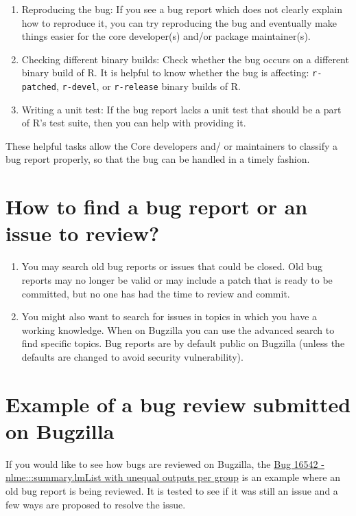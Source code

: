 \documentclass[
]{book}
\begin{document}
\begin{enumerate}
\def\labelenumi{\arabic{enumi}.}
\item
  Reproducing the bug: If you see a bug report which does not clearly explain how to reproduce it, you can try reproducing the bug and eventually make things easier for the core developer(s) and/or package maintainer(s).
\item
  Checking different binary builds: Check whether the bug occurs on a different binary build of R. It is helpful to know whether the bug is affecting: \texttt{r-patched}, \texttt{r-devel}, or \texttt{r-release} binary builds of R.
\item
  Writing a unit test: If the bug report lacks a unit test that should be a part of R's test suite, then you can help with providing it.
\end{enumerate}

These helpful tasks allow the Core developers and/ or maintainers to classify a bug report properly, so that the bug can be handled in a timely fashion.

\section{How to find a bug report or an issue to review?}\label{how-to-find-a-bug-report-or-an-issue-to-review}

\begin{enumerate}
\def\labelenumi{\arabic{enumi}.}
\item
  You may search old bug reports or issues that could be closed. Old bug reports may no longer be valid or may include a patch that is ready to be committed, but no one has had the time to review and commit.
\item
  You might also want to search for issues in topics in which you have a working knowledge. When on Bugzilla you can use the advanced search to find specific topics. Bug reports are by default public on Bugzilla (unless the defaults are changed to avoid security vulnerability).
\end{enumerate}

\section{Example of a bug review submitted on Bugzilla}\label{example-of-a-bug-review-submitted-on-bugzilla}

If you would like to see how bugs are reviewed on Bugzilla, the \href{https://bugs.r-project.org/bugzilla/show_bug.cgi?id=16542}{Bug 16542 - nlme:::summary.lmList with unequal outputs per group} is an example where an old bug report is being reviewed. It is tested to see if it was still an issue and a few ways are proposed to resolve the issue.
\end{document}
